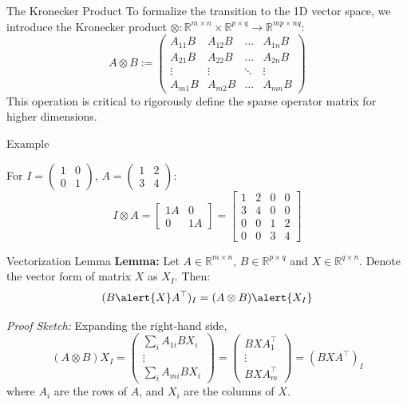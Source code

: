 \documentclass[aspectratio=169]{beamer}
\begin{document}
\begin{frame}{The Kronecker Product}
    To formalize the transition to the 1D vector space, we introduce the Kronecker product $\otimes : \mathbb{R}^{m \times n} \times \mathbb{R}^{p \times q} \to \mathbb{R}^{mp \times nq}$:
    \[
    A \otimes B :=
    \begin{pmatrix}
        A_{11}B & A_{12}B & \dots & A_{1n}B \\
        A_{21}B & A_{22}B & \dots & A_{2n}B \\
        \vdots & \vdots & \ddots & \vdots \\
        A_{m1}B & A_{m2}B & \dots & A_{mn}B
    \end{pmatrix}
    \]
    This operation is critical to rigorously define the sparse operator matrix for higher dimensions.
\end{frame}

\begin{frame}{Example}
    \begin{example}
        For $I=\left(\begin{smallmatrix}1&0 \\ 0&1 \end{smallmatrix}\right)$, $A = \left(\begin{smallmatrix}1&2\\3&4\end{smallmatrix}\right)$:
        $$ I\otimes A = \begin{bmatrix} 1 A & 0 \\ 0 & 1 A \end{bmatrix} = \begin{bmatrix} 1 & 2 & 0 & 0 \\ 3 & 4 & 0 & 0 \\ 0 & 0 & 1 & 2 \\ 0 & 0 & 3 & 4
        \end{bmatrix} $$
    \end{example}

\end{frame}

\begin{frame}{Vectorization Lemma}
    \textbf{Lemma:} Let $A \in \mathbb{R}^{m \times n}$, $B \in \mathbb{R}^{p \times q}$ and $X \in \mathbb{R}^{q \times n}$. Denote the vector form of matrix $X$ as $X_I$. Then:
    \[
        (B \alert{X} A^\top)_I = (A \otimes B) \alert{X_I}
    \]
    
    \textit{Proof Sketch:} Expanding the right-hand side,
    \[
    (A \otimes B) X_I = 
    \begin{pmatrix}
        \sum_i A_{1i} B X_i \\
        \vdots \\
        \sum_i A_{mi} B X_i
    \end{pmatrix}
    =
    \begin{pmatrix}
        B X A_1^\top \\
        \vdots \\
        B X A_m^\top
    \end{pmatrix}
    = (B X A^\top)_I
    \]
    where $A_i$ are the rows of $A$, and $X_i$ are the columns of $X$.
\end{frame}
\end{document}
